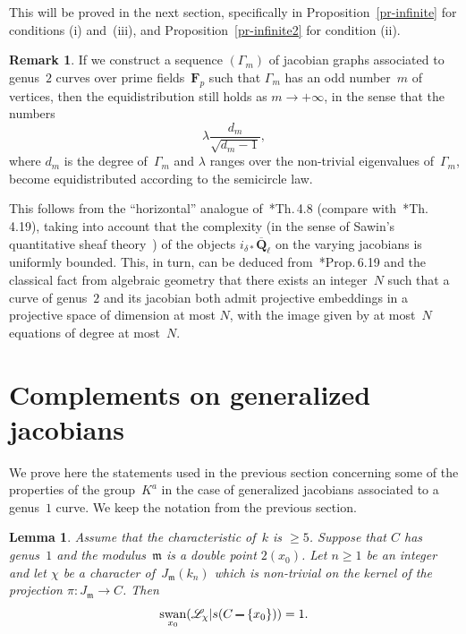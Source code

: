 \documentclass[12pt]{amsart}
\renewcommand{\geq}{\geqslant}
\numberwithin{equation}{section}
\def\setminus{\mathchoice
    {\mathbin{\vrule height .62ex width 1.61ex depth -.38ex}}%
    {\mathbin{\vrule height .62ex width 1.61ex depth -.38ex}}%
    {\mathbin{\vrule height .50ex width 0.85ex depth -.28ex}}%
    {\mathbin{\vrule height .20ex width 0.570ex depth -.24ex}}%
}
\newcommand{\Qq}{\mathbf{Q}}
\newcommand{\Ff}{\mathbf{F}}
\newcommand{\bQl}{\overline{\Qq}_{\ell}}
\newcommand{\mfm}{\mathfrak{m}}
\DeclareMathOperator{\swan}{swan}
\theoremstyle{plain}
\newtheorem{lemma}[theorem]{Lemma}
\theoremstyle{remark}
\theoremstyle{definition}
\newtheorem{remark}[theorem]{Remark}
\newcommand{\mcL}{\mathscr{L}}
\renewcommand{\geq}{\geqslant}
\begin{document}
This will be proved in the next section, specifically in
Proposition~\ref{pr-infinite} for conditions (i) and~(iii), and
Proposition~\ref{pr-infinite2} for condition (ii). 

\begin{remark}
  If we construct a sequence $(\Gamma_m)$ of jacobian graphs
  associated to genus~$2$ curves over prime fields~$\Ff_p$ such that
  $\Gamma_m$ has an odd number~$m$ of vertices, then the equidistribution still holds as
  $m\to+\infty$, in the sense that the numbers
  \[
    \lambda \frac{d_m}{\sqrt{d_m-1}},
  \]
  where $d_m$ is the degree of~$\Gamma_m$ and $\lambda$ ranges over
  the non-trivial eigenvalues of~$\Gamma_m$, become equidistributed
  according to the semicircle law.

  This follows from the ``horizontal'' analogue
  of~\cite{ffk}*{Th.\,4.8} (compare with~\cite{ffk}*{Th.\,4.19}),
  taking into account that the complexity (in the sense of Sawin's
  quantitative sheaf theory~\cite{qst}) of the objects
  $i_{\delta*}\bQl$ on the varying jacobians is uniformly
  bounded. This, in turn, can be deduced from~\cite{qst}*{Prop.\,6.19}
  and the classical fact from algebraic geometry that there exists an
  integer~$N$ such that a curve of genus~$2$ and its jacobian both
  admit projective embeddings in a projective space of
  dimension at most $N$, with the image given by at most~$N$ equations of
  degree at most~$N$.
\end{remark}

\section{Complements on generalized jacobians}

We prove here the statements used in the previous section
concerning some of the properties of the group~$K^a$ in the case of
generalized jacobians associated to a genus~$1$ curve. We keep the
notation from the previous section.

\begin{lemma}\label{lm-swan}
  Assume that the characteristic of~$k$ is $\geq 5$.  Suppose that $C$
  has genus~$1$ and the modulus~$\mfm$ is a double point $2(x_0)$. Let
  $n\geq 1$ be an integer and let $\chi$ be a character of~$J_{\mfm}(k_n)$ which is non-trivial on the kernel of the projection
  $\pi\colon J_{\mfm}\to C$. Then
  \[
    \swan_{x_0}(\mcL_{\chi}|s(C\setminus \{x_0\}))=1. 
  \]
\end{lemma}
\end{document}
